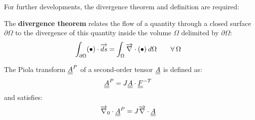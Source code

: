 For further developments, the divergence theorem and definition are required:
\begin{theorem}[Ostrogradski]
  The \textbf{divergence theorem} relates the flow of a quantity through a closed surface $\partial\Omega$ to the divergence of this quantity inside the volume $\Omega$ delimited by $\partial \Omega$:
\begin{equation}
  \label{eq:Ostrogradski_th}
  \int_{\partial \Omega} (\bullet)\cdot {\overrightarrow{ds}}=\int_\Omega {\overrightarrow{\nabla}} \cdot (\bullet) \: d\Omega \qquad \forall\:\Omega
\end{equation}
\end{theorem}
\begin{definition}
  \label{def:Piola_transform}
  The Piola transform ${\underline{\underline{A}}}^P$ of a second-order tensor ${\underline{\underline{A}}}$ is defined as:
  \begin{equation*}
    {\underline{\underline{A}}}^P=J{\underline{\underline{A}}}\cdot{\underline{\underline{F}}}^{-T}
  \end{equation*}
  and satisfies:
  \begin{equation*}
    {\overrightarrow{\nabla}}_0\cdot {\underline{\underline{A}}}^P = J {\overrightarrow{\nabla}} \cdot {\underline{\underline{A}}}
  \end{equation*}
\end{definition}

